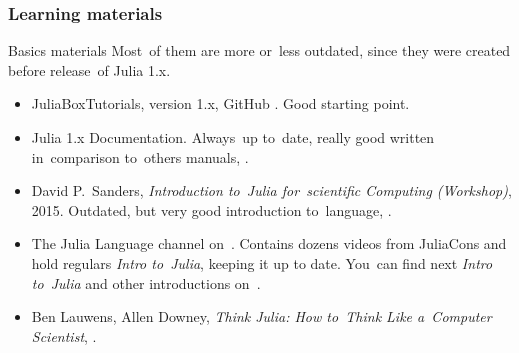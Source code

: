 \documentclass{beamer}  %
\begin{document}
\begin{frame}
  \frametitle{Learning materials}

  \begin{block}{Basics materials}
    Most~of them are more or~less outdated, since they were created
    before release~of Julia 1.x.
    \begin{itemize}
    \item JuliaBoxTutorials, version 1.x, GitHub
      .
      Good starting point.
    \item Julia 1.x Documentation. Always~up to~date, really good
      written in~comparison to~others manuals,
      .
    \item David P.~Sanders, \emph{Introduction to~Julia for~scientific
        Computing (Workshop)}, 2015. Outdated, but very good
      introduction to~language,
      .
    \item The Julia Language channel
      on~.
      Contains dozens videos from JuliaCons and hold regulars
      \emph{Intro to~Julia}, keeping it up to date. You~can find next
      \emph{Intro to~Julia} and other introductions
      on~.
    \item Ben Lauwens, Allen Downey, \emph{Think Julia: How to~Think
        Like a~Computer Scientist},
      .
    \end{itemize}
  \end{block}

\end{frame}
\end{document}
